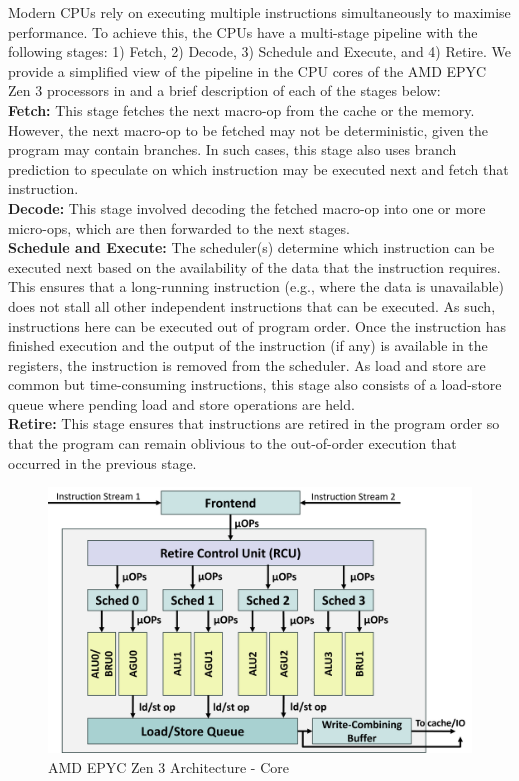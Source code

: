 Modern CPUs rely on executing multiple instructions simultaneously to maximise performance.
To achieve this, the CPUs have a multi-stage pipeline with the following stages: 1) Fetch, 2) Decode, 3) Schedule and Execute, and 4) Retire.
We provide a simplified view of the pipeline in the CPU cores of the AMD EPYC Zen 3 processors in  and a brief description of each of the stages below:\\
\textbf{Fetch: } This stage fetches the next macro-op from the cache or the memory. 
However, the next macro-op to be fetched may not be deterministic, given the program may contain branches. 
In such cases, this stage also uses branch prediction to speculate on which instruction may be executed next and fetch that instruction.\\
\textbf{Decode: } This stage involved decoding the fetched macro-op into one or more micro-ops, which are then forwarded to the next stages.\\
\textbf{Schedule and Execute: } The scheduler(s) determine which instruction can be executed next based on the availability of the data that the instruction requires. 
This ensures that a long-running instruction (e.g., where the data is unavailable) does not stall all other independent instructions that can be executed.
As such, instructions here can be executed out of program order. 
Once the instruction has finished execution and the output of the instruction (if any) is available in the registers, the instruction is removed from the scheduler.
As load and store are common but time-consuming instructions, this stage also consists of a load-store queue where pending load and store operations are held. \\
\textbf{Retire: } This stage ensures that instructions are retired in the program order so that the program can remain oblivious to the out-of-order execution that occurred in the previous stage.

\begin{figure}[!htb]
    \centering
    \includegraphics[width=\columnwidth]{figures/interconnect-sc/amd_arch/core.png}
    \caption{AMD EPYC Zen 3 Architecture - Core}
    \label{fig:amd-core}
\end{figure}

